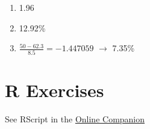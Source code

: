 \documentclass[12pt,a4paper]{article}
\providecommand{\tightlist}{%
  \setlength{\itemsep}{0pt}\setlength{\parskip}{0pt}}
\begin{document}
\begin{enumerate}
\def\labelenumi{\arabic{enumi}.}
\setcounter{enumi}{1}
\tightlist
\item
  1.96 \vspace{0.25cm}
\item
  12.92\% \vspace{0.25cm}
\item
  \(\frac{50-62.3}{8.5}=-1.447059\) \(\rightarrow\) 7.35\%
\end{enumerate}

\section*{R Exercises}\label{r-exercises}

See RScript in the
\href{https://drflolinke.github.io/PO91Q/11-Downloads.html}{Online
Companion}


\printbibliography[title=List of References]
\end{document}
